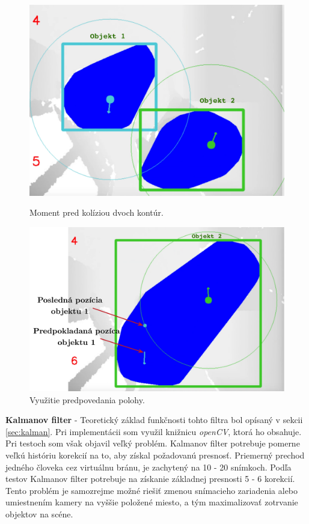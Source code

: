 \begin{figure}[H]
  \centering
  \begin{minipage}[b]{0.4\textwidth}
    \includegraphics[width=\textwidth]{images/beforeCollision}
    \caption{Moment pred kolíziou dvoch kontúr.}
  \end{minipage}
  \hfill
  \begin{minipage}[b]{0.55\textwidth}
    \includegraphics[width=\textwidth]{images/predicate}
    \caption{Využitie predpovedania polohy.}
  \end{minipage}
\end{figure}



\textbf{Kalmanov filter} - Teoretický základ funkčnosti tohto filtra bol opísaný v sekcii \ref{sec:kalman}. Pri implementácii som využil knižnicu \textit{openCV}, ktorá ho obsahuje. Pri testoch som však objavil veľký problém. Kalmanov filter potrebuje pomerne veľkú históriu korekcií na to, aby získal požadovanú presnosť. Priemerný prechod jedného človeka cez virtuálnu bránu, je zachytený na 10 - 20 snímkoch. Podľa testov Kalmanov filter potrebuje na získanie základnej presnosti 5 - 6 korekcií. Tento problém je samozrejme možné riešiť zmenou snímacieho zariadenia alebo umiestnením kamery na vyššie položené miesto, a tým maximalizovať zotrvanie objektov na scéne. 

